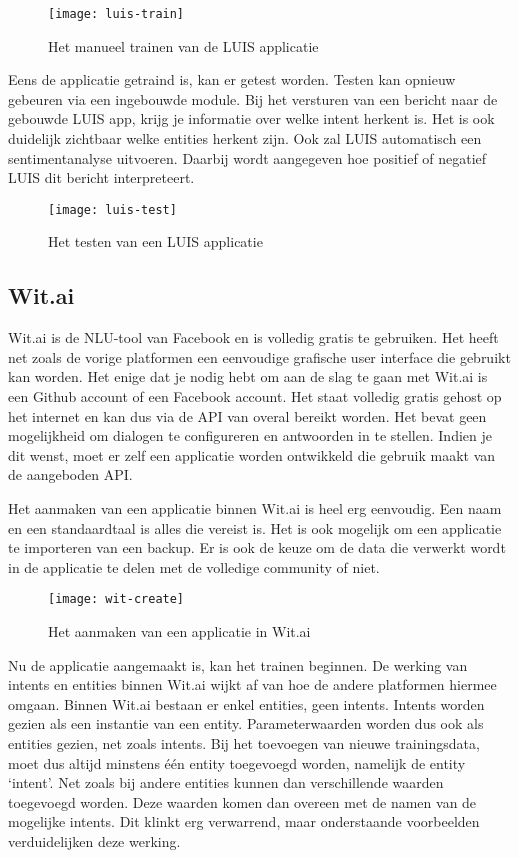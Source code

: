 \begin{figure}[H]
    \label{fig:luis-train}
    \centering
    \texttt{[image: luis-train]}
    \caption{Het manueel trainen van de LUIS applicatie}
\end{figure}

Eens de applicatie getraind is, kan er getest worden. Testen kan opnieuw gebeuren via een ingebouwde module. Bij het versturen van een bericht naar de gebouwde LUIS app, krijg je informatie over welke intent herkent is.
Het is ook duidelijk zichtbaar welke entities herkent zijn. Ook zal LUIS automatisch een sentimentanalyse uitvoeren. Daarbij wordt aangegeven hoe positief of negatief LUIS dit bericht interpreteert.

\begin{figure}[H]
    \label{fig:luis-test}
    \centering
    \texttt{[image: luis-test]}
    \caption{Het testen van een LUIS applicatie}
\end{figure}

\subsection{Wit.ai}
\label{subsec:werking-platformen-wit}

Wit.ai is de NLU-tool van Facebook en is volledig gratis te gebruiken. Het heeft net zoals de vorige platformen een eenvoudige grafische user interface die gebruikt kan worden. Het enige dat je nodig hebt om aan de slag te gaan met Wit.ai is een Github account of een Facebook account. Het staat volledig gratis gehost op het internet en kan dus via de API van overal bereikt worden. Het bevat geen mogelijkheid om dialogen te configureren en antwoorden in te stellen. Indien je dit wenst, moet er zelf een applicatie worden ontwikkeld die gebruik maakt van de aangeboden API.

Het aanmaken van een applicatie binnen Wit.ai is heel erg eenvoudig. Een naam en een standaardtaal is alles die vereist is. Het is ook mogelijk om een applicatie te importeren van een backup. Er is ook de keuze om de data die verwerkt wordt in de applicatie te delen met de volledige community of niet.

\begin{figure}[H]
    \label{fig:wit-create}
    \centering
    \texttt{[image: wit-create]}
    \caption{Het aanmaken van een applicatie in Wit.ai}
\end{figure}

Nu de applicatie aangemaakt is, kan het trainen beginnen. De werking van intents en entities binnen Wit.ai wijkt af van hoe de andere platformen hiermee omgaan. Binnen Wit.ai bestaan er enkel entities, geen intents. Intents worden gezien als een instantie van een entity. Parameterwaarden worden dus ook als entities gezien, net zoals intents. Bij het toevoegen van nieuwe trainingsdata, moet dus altijd minstens één entity toegevoegd worden, namelijk de entity ‘intent’. Net zoals bij andere entities kunnen dan verschillende waarden toegevoegd worden. Deze waarden komen dan overeen met de namen van de mogelijke intents. Dit klinkt erg verwarrend, maar onderstaande voorbeelden verduidelijken deze werking.

